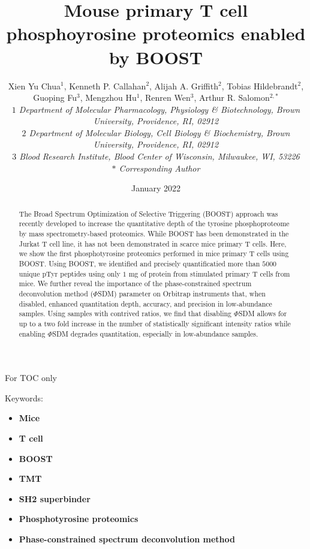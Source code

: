 \documentclass[journal=jprobs,manuscript=article]{achemso}
\title{Mouse primary T cell phosphoyrosine proteomics enabled by BOOST}
\author{Xien Yu Chua$^{1}$, Kenneth P. Callahan$^{2}$, Alijah A. Griffith$^{2}$, Tobias Hildebrandt$^{2}$, Guoping Fu$^{3}$, Mengzhou Hu$^{1}$, Renren Wen$^{3}$, Arthur R. Salomon$^{2,*}$
\\
\singlespacing
\textit{\small{$1$ Department of Molecular Pharmacology, Physiology \& Biotechnology, Brown University, Providence, RI, 02912}}
\\
\textit{\small{$2$ Department of Molecular Biology, Cell Biology \& Biochemistry, Brown University, Providence, RI, 02912}}
\\
\textit{\small{$3$ Blood Research Institute, Blood Center of Wisconsin, Milwaukee, WI, 53226}}
\\
\textit{\small{$*$} Corresponding Author}\tiny}
\date{January 2022}
\begin{document}
\maketitle

\begin{tocentry}

For TOC only

\end{tocentry}


\begin{abstract}

The Broad Spectrum Optimization of Selective Triggering (BOOST) approach was recently developed to increase the quantitative depth of the tyrosine phosphoproteome by mass spectrometry-based proteomics. While BOOST has been demonstrated in the Jurkat T cell line, it has not been demonstrated in scarce mice primary T cells. Here, we show the first phosphotyrosine proteomics performed in mice primary T cells using BOOST. Using BOOST, we identified and precisely quantificatied more than $5000$ unique pTyr peptides using only $1$ mg of protein from stimulated primary T cells from mice. We further reveal the importance of the phase-constrained spectrum deconvolution method ($\Phi$SDM) parameter on Orbitrap instruments that, when disabled, enhanced quantitation depth, accuracy, and precision in low-abundance samples. Using samples with contrived ratios, we find that disabling $\Phi$SDM allows for up to a two fold increase in the number of statistically significant intensity ratios while enabling $\Phi$SDM degrades quantitation, especially in low-abundance samples.


\end{abstract}

Keywords:

\begin{itemize}
    \item {\textbf{Mice}}
    \item {\textbf{T cell}}
    \item {\textbf{BOOST} }
    \item {\textbf{TMT} }
    \item {\textbf{SH2 superbinder}}
    \item {\textbf{Phosphotyrosine proteomics} }
    \item {\textbf{Phase-constrained spectrum deconvolution method}}
\end{itemize}
\end{document}
